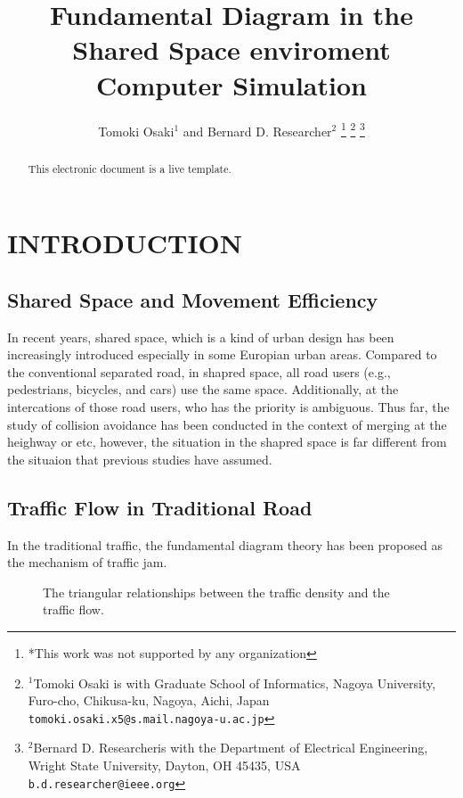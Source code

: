 \documentclass[letterpaper, 10 pt, conference]{ieeeconf}  %
\title{\LARGE \bf
Fundamental Diagram in the Shared Space enviroment Computer Simulation
}
\author{Tomoki Osaki$^{1}$ and Bernard D. Researcher$^{2}$
\thanks{*This work was not supported by any organization}%
\thanks{$^{1}$Tomoki Osaki is with Graduate School of Informatics,
        Nagoya University, Furo-cho, Chikusa-ku, Nagoya, Aichi, Japan
        {\tt\small tomoki.osaki.x5@s.mail.nagoya-u.ac.jp}}%
\thanks{$^{2}$Bernard D. Researcheris with the Department of Electrical Engineering, Wright State University,
        Dayton, OH 45435, USA
        {\tt\small b.d.researcher@ieee.org}}%
}
\begin{document}
\maketitle
\thispagestyle{empty}
\pagestyle{empty}


\begin{abstract}
This electronic document is a live template. 
\end{abstract}

\section{INTRODUCTION}
\subsection{Shared Space and Movement Efficiency}
In recent years, shared space, which is a kind of urban design has been increasingly introduced especially in some Europian urban areas. Compared to the conventional separated road, in shapred space, all road users (e.g., pedestrians, bicycles, and cars) use the same space. Additionally, at the intercations of those road users, who has the priority is ambiguous. Thus far, the study of collision avoidance has been conducted in the context of merging at the heighway or etc, however, the situation in the shapred space is far different from the situaion that previous studies have assumed.

\subsection{Traffic Flow in Traditional Road}
In the traditional traffic, the fundamental diagram theory has been proposed as the mechanism of traffic jam.

\begin{figure}[thpb]
   \centering
   \caption{The triangular relationships between the traffic density and the traffic flow.}
   \label{fig:triangular_fd}
\end{figure}
\end{document}
